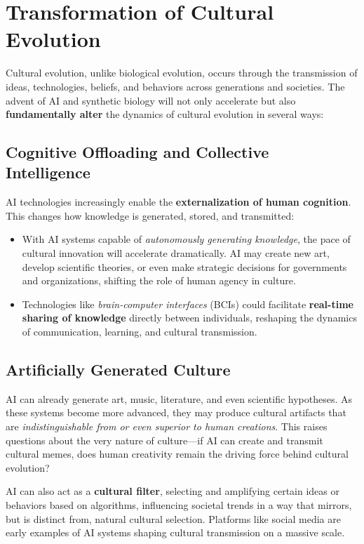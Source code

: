 \documentclass[10pt,titlepage]{book}
\begin{document}
\section{Transformation of Cultural Evolution}

Cultural evolution, unlike biological evolution, occurs through the transmission of ideas, technologies, beliefs, and behaviors across generations and societies. The advent of AI and synthetic biology will not only accelerate but also \textbf{fundamentally alter} the dynamics of cultural evolution in several ways:

\subsection{Cognitive Offloading and Collective Intelligence}

AI technologies increasingly enable the \textbf{externalization of human cognition}. This changes how knowledge is generated, stored, and transmitted:
\begin{itemize}
    \item With AI systems capable of \textit{autonomously generating knowledge}, the pace of cultural innovation will accelerate dramatically. AI may create new art, develop scientific theories, or even make strategic decisions for governments and organizations, shifting the role of human agency in culture.
    \item Technologies like \textit{brain-computer interfaces} (BCIs) could facilitate \textbf{real-time sharing of knowledge} directly between individuals, reshaping the dynamics of communication, learning, and cultural transmission.
\end{itemize}

\subsection{Artificially Generated Culture}

AI can already generate art, music, literature, and even scientific hypotheses. As these systems become more advanced, they may produce cultural artifacts that are \textit{indistinguishable from or even superior to human creations}. This raises questions about the very nature of culture—if AI can create and transmit cultural memes, does human creativity remain the driving force behind cultural evolution? 

AI can also act as a \textbf{cultural filter}, selecting and amplifying certain ideas or behaviors based on algorithms, influencing societal trends in a way that mirrors, but is distinct from, natural cultural selection. Platforms like social media are early examples of AI systems shaping cultural transmission on a massive scale.
\end{document}
